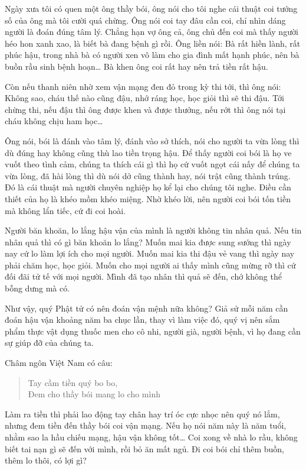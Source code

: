 \documentclass[
  12pt,
  oneside]{book}
\begin{document}
Ngày xưa tôi có quen một ông thầy bói, ông nói cho tôi nghe cái thuật coi tướng số của ông mà tôi cười quá chừng. Ông nói coi tay đâu cần coi, chỉ nhìn dáng người là đoán đúng tâm lý. Chẳng hạn vợ ông cả, ông chủ đến coi mà thấy người héo hon xanh xao, là biết bà đang bệnh gì rồi. Ông liền nói: Bà rất hiền lành, rất phúc hậu, trong nhà bà có người xen vô làm cho gia đình mất hạnh phúc, nên bà buồn rầu sinh bệnh hoạn\ldots{} Bà khen ông coi rất hay nên trả tiền rất hậu.

Còn nếu thanh niên nhờ xem vận mạng đen đỏ trong kỳ thi tới, thì ông nói: Không sao, cháu thế nào cũng đậu, nhớ ráng học, học giỏi thì sẽ thi đậu. Tới chừng thi, nếu đậu thì ông được khen và được thưởng, nếu rớt thì ông nói tại cháu không chịu ham học\ldots{}

Ông nói, bói là đánh vào tâm lý, đánh vào sở thích, nói cho người ta vừa lòng thì dù đúng hay không cũng thù lao tiền trọng hậu. Để thấy người coi bói là họ ve vuốt theo tình cảm, chúng ta thích cái gì thì họ cứ vuốt ngọt cái nấy để chúng ta vừa lòng, đã hài lòng thì dù nói dở cũng thành hay, nói trật cũng thành trúng. Đó là cái thuật mà người chuyên nghiệp họ kể lại cho chúng tôi nghe. Điều cần thiết của họ là khéo mồm khéo miệng. Nhờ khéo lời, nên người coi bói tốn tiền mà không lẩn tiếc, cứ đi coi hoài.

Người băn khoăn, lo lắng hậu vận của mình là người không tin nhân quả. Nếu tin nhân quả thì có gì băn khoăn lo lắng? Muốn mai kia được sung sướng thì ngày nay cứ lo làm lợi ích cho mọi người. Muốn mai kia thi đậu vẻ vang thì ngày nay phải chăm học, học giỏi. Muốn cho mọi người ai thấy mình cũng mừng rỡ thì cứ đối đãi tử tế với mọi người. Mình đã tạo nhân thì quả sẽ đến, chớ không thể bỗng dưng mà có.

Như vậy, quý Phật tử có nên đoán vận mệnh nữa không? Giả sử mỗi năm cần đoán hậu vận khoảng năm ba chục lần, thay vì làm việc đó, quý vị nên sắm phẩm thực vật dụng thuốc men cho cô nhi, người già, người bệnh, vì họ đang cần sự giúp đỡ của chúng ta.

Châm ngôn Việt Nam có câu:

\begin{quote}
Tay cầm tiền quý bo bo,\\
Đem cho thầy bói mang lo cho mình
\end{quote}

Làm ra tiền thì phải lao động tay chân hay trí óc cực nhọc nên quý nó lắm, nhưng đem tiền đến thầy bói coi vận mạng. Nếu họ nói năm này là năm tuổi, nhằm sao la hầu chiếu mạng, hậu vận không tốt\ldots{} Coi xong về nhà lo rầu, không biết tai nạn gì sẽ đến với mình, rồi bỏ ăn mất ngủ. Đi coi bói chỉ thêm buồn, thêm lo thôi, có lợi gì?
\end{document}
